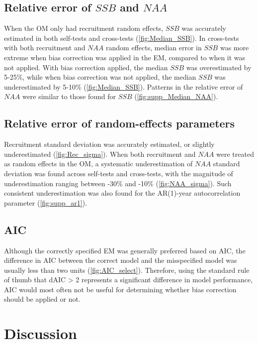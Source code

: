 \documentclass[
  12pt,
]{article}
\begin{document}
\subsection{\texorpdfstring{Relative error of \(SSB\) and
\(NAA\)}{Relative error of SSB and NAA}}\label{relative-error-of-ssb-and-naa}

When the OM only had recruitment random effects, \(SSB\) was accurately
estimated in both self-tests and cross-tests (\autoref{fig:Median_SSB}).
In cross-tests with both recruitment and \(NAA\) random effects, median
error in \(SSB\) was more extreme when bias correction was applied in
the EM, compared to when it was not applied. With bias correction
applied, the median \(SSB\) was overestimated by 5-25\%, while when bias
correction was not applied, the median \(SSB\) was underestimated by
5-10\% (\autoref{fig:Median_SSB}). Patterns in the relative error of
\(NAA\) were similar to those found for \(SSB\)
(\autoref{fig:supp_Median_NAA}).

\subsection{Relative error of random-effects
parameters}\label{relative-error-of-random-effects-parameters}

Recruitment standard deviation was accurately estimated, or slightly
underestimated (\autoref{fig:Rec_sigma}). When both recruitment and
\(NAA\) were treated as random effects in the OM, a systematic
underestimation of \(NAA\) standard deviation was found across
self-tests and cross-tests, with the magnitude of underestimation
ranging between -30\% and -10\% (\autoref{fig:NAA_sigma}). Such
consistent underestimation was also found for the AR(1)-year
autocorrelation parameter (\autoref{fig:supp_ar1}).

\subsection{AIC}\label{aic}

Although the correctly specified EM was generally preferred based on
AIC, the difference in AIC between the correct model and the
misspecified model was usually less than two units
(\autoref{fig:AIC_select}). Therefore, using the standard rule of thumb
that dAIC \textgreater{} 2 represents a significant difference in model
performance, AIC would most often not be useful for determining whether
bias correction should be applied or not.

\section{Discussion}\label{discussion}
\end{document}
